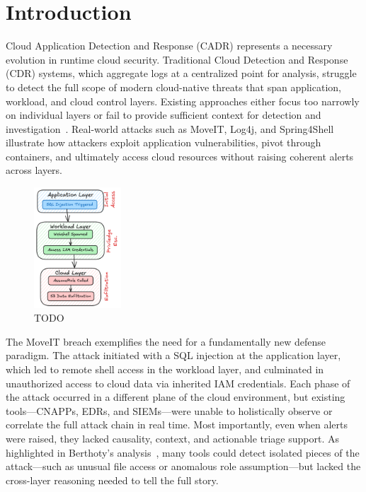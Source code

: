 \section*{Introduction}

Cloud Application Detection and Response (CADR) represents a necessary evolution in runtime cloud security. Traditional Cloud Detection and Response (CDR) systems, which aggregate logs at a centralized point for analysis, struggle to detect the full scope of modern cloud-native threats that span application, workload, and cloud control layers. Existing approaches either focus too narrowly on individual layers or fail to provide sufficient context for detection and investigation~\cite{berthoty2025runtime}. Real-world attacks such as MoveIT, Log4j, and Spring4Shell illustrate how attackers exploit application vulnerabilities, pivot through containers, and ultimately access cloud resources without raising coherent alerts across layers.


\begin{figure}
    \centering \includegraphics[width=0.29\textwidth]{fig/moveit.png}
    \caption{TODO}
    \label{fig:example:moveit}
    \vspace{-2ex}
\end{figure}

The MoveIT breach exemplifies the need for a fundamentally new defense paradigm. The attack initiated with a SQL injection at the application layer, which led to remote shell access in the workload layer, and culminated in unauthorized access to cloud data via inherited IAM credentials. Each phase of the attack occurred in a different plane of the cloud environment, but existing tools—CNAPPs, EDRs, and SIEMs—were unable to holistically observe or correlate the full attack chain in real time. Most importantly, even when alerts were raised, they lacked causality, context, and actionable triage support. As highlighted in Berthoty’s analysis~\cite{berthoty2025runtime}, many tools could detect isolated pieces of the attack—such as unusual file access or anomalous role assumption—but lacked the cross-layer reasoning needed to tell the full story.


